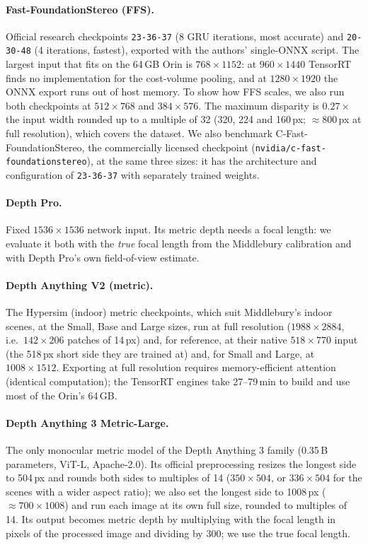 \documentclass[10pt,twocolumn]{article}
\begin{document}
\paragraph{Fast-FoundationStereo (FFS).} Official research checkpoints \texttt{23-36-37} (8 GRU
iterations, most accurate) and \texttt{20-30-48} (4 iterations, fastest), exported with the
authors' single-ONNX script. The largest input that fits on the 64\,GB Orin is $768\times1152$: at
$960\times1440$ TensorRT finds no implementation for the cost-volume pooling, and at
$1280\times1920$ the ONNX export runs out of host memory. To show how FFS scales, we also run both
checkpoints at $512\times768$ and $384\times576$. The maximum disparity is $0.27\times$ the input width
rounded up to a multiple of 32 (320, 224 and 160\,px; ${\approx}$800\,px at full resolution), which
covers the dataset. We also benchmark C-Fast-FoundationStereo, the commercially licensed checkpoint
(\texttt{nvidia/c-fast-foundationstereo}), at the same three sizes: it has the architecture and
configuration of \texttt{23-36-37} with separately trained weights.
\paragraph{Depth Pro.} Fixed $1536\times1536$ network input. Its metric depth needs a focal length:
we evaluate it both with the \emph{true} focal length from the Middlebury calibration and with Depth
Pro's own field-of-view estimate.
\paragraph{Depth Anything V2 (metric).} The Hypersim (indoor) metric checkpoints, which suit
Middlebury's indoor scenes, at the Small, Base and Large sizes, run at full resolution
($1988\times2884$, i.e.\ $142\times206$ patches of 14\,px) and, for reference, at their native
$518\times770$ input (the 518\,px short side they are trained at) and, for Small and Large, at
$1008\times1512$. Exporting at full resolution
requires memory-efficient attention (identical computation); the TensorRT engines take 27--79\,min to
build and use most of the Orin's 64\,GB.
\paragraph{Depth Anything 3 Metric-Large.} The only monocular metric model of the Depth Anything 3
family (0.35\,B parameters, ViT-L, Apache-2.0). Its official preprocessing resizes the longest side
to 504\,px and rounds both sides to multiples of 14 ($350\times504$, or $336\times504$ for the scenes
with a wider aspect ratio); we also set the longest side to 1008\,px (${\approx}700\times1008$) and run
each image at its own full size, rounded to multiples of 14. Its output becomes metric depth by
multiplying with the focal length in pixels of the processed image and dividing by 300; we use the
true focal length.
\end{document}
